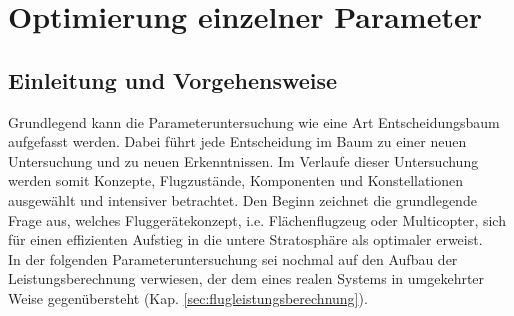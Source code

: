 \chapter{Optimierung einzelner Parameter}
\label{chap:parameteruntersuchung}

\section{Einleitung und Vorgehensweise}
\label{sec:einleitung_und_vorgehensweise}
Grundlegend kann die Parameteruntersuchung wie eine Art Entscheidungsbaum aufgefasst werden. Dabei führt jede Entscheidung im Baum zu einer neuen Untersuchung und zu neuen Erkenntnissen. Im Verlaufe dieser Untersuchung werden somit Konzepte, Flugzustände, Komponenten und Konstellationen ausgewählt und intensiver betrachtet. Den Beginn zeichnet die grundlegende Frage aus, welches Fluggerätekonzept, i.e. Flächenflugzeug oder Multicopter, sich für einen effizienten Aufstieg in die untere Stratosphäre als optimaler erweist. \\
In der folgenden Parameteruntersuchung sei nochmal auf den Aufbau der Leistungsberechnung verwiesen, der dem eines realen Systems in umgekehrter Weise gegenübersteht (Kap. \ref{sec:flugleistungsberechnung}).


